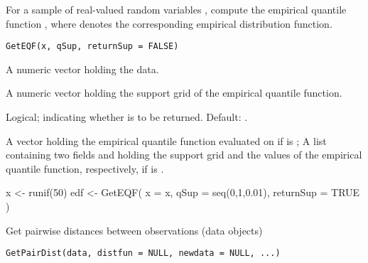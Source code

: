 \documentclass[a4paper]{book}
\begin{document}
%
\begin{Description}\relax
For a sample of real-valued random variables , compute the empirical quantile function 
, where  denotes 
the corresponding empirical distribution function.
\end{Description}
%
\begin{Usage}
\begin{verbatim}
GetEQF(x, qSup, returnSup = FALSE)
\end{verbatim}
\end{Usage}
%
\begin{Arguments}
\begin{ldescription}
\item[\code{x}] A numeric vector holding the data.

\item[\code{qSup}] A numeric vector holding the support grid of the empirical quantile function.

\item[\code{returnSup}] Logical; indicating whether  is to be returned. Default: .
\end{ldescription}
\end{Arguments}
%
\begin{Value}
A vector holding the empirical quantile function evaluated on  
if  is ; 
A list containing two fields  and  holding the support grid and 
the values of the empirical quantile function, respectively, 
if  is .
\end{Value}
%
\begin{Examples}
\begin{ExampleCode}
x <- runif(50)
edf <- GetEQF( x = x, qSup = seq(0,1,0.01), returnSup = TRUE )
\end{ExampleCode}
\end{Examples}
%
\begin{Description}\relax
Get pairwise distances between observations (data objects)
\end{Description}
%
\begin{Usage}
\begin{verbatim}
GetPairDist(data, distfun = NULL, newdata = NULL, ...)
\end{verbatim}
\end{Usage}
\end{document}
